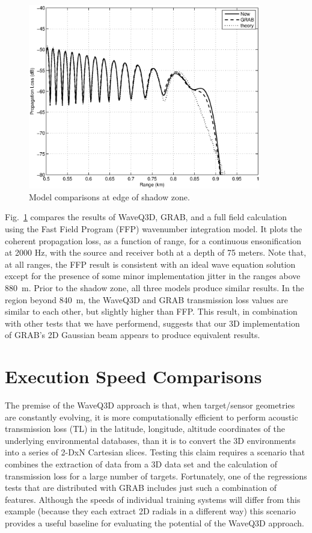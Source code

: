 \documentclass{ws-jca}
\newcommand{\threeD}{3\nobreakdash\textendash D }	%
\newcommand{\twoD}{2\nobreakdash\textendash D }	%
\begin{document}
\begin{figure}[th]
	\centerline{\includegraphics[width=4in]{pedersen_shallow_compare.eps}} 
	\vspace*{8pt}
	\caption{Model comparisons at edge of shadow zone. \label{fig:n2_shallow}}
\end{figure}

Fig.~\ref{fig:n2_shallow} compares the results of WaveQ3D, GRAB, and a full field calculation using the Fast Field Program (FFP) wavenumber integration model.\cite{DiNapoli1980,Brekhovskikh1980}  
It  plots the coherent propagation loss, as a function of range, for a continuous ensonification at 2000 Hz, with the source and receiver both at a depth of 75 meters.  Note that, at all ranges, the FFP result is consistent with an ideal wave equation solution except for the presence of some minor implementation jitter in the ranges above 880~m.  Prior to the shadow zone, all three models produce similar results. In the region beyond 840~m, the WaveQ3D and GRAB transmission loss values are similar to each other, but slightly higher than FFP. This result, in combination with other tests that we have performend, suggests that our \threeD implementation of GRAB's \twoD Gaussian beam appears to produce equivalent results.

\section{Execution Speed Comparisons}

The premise of the WaveQ3D approach is that, when target/sensor geometries are constantly evolving, it is more computationally efficient to perform acoustic transmission loss (TL) in the latitude, longitude, altitude coordinates of the underlying environmental databases, than it is to convert the \threeD environments into a series of 2-DxN Cartesian slices. Testing this claim requires a scenario that combines the extraction of data from a \threeD data set and the calculation of transmission loss for a large number of targets.  Fortunately, one of the regressions tests that are distributed with GRAB includes just such a combination of features.  Although the speeds of individual training systems will differ from this example (because they each extract \twoD radials in a different way) this scenario provides a useful baseline for evaluating the potential of the WaveQ3D approach.
\end{document}
